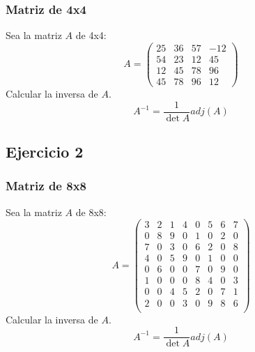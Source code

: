 \documentclass{beamer}
\begin{document}
    \begin{frame}
        \frametitle{Matriz de 4x4}
        Sea la matriz $A$ de 4x4:
        $$
        A =
        \begin{pmatrix}
            25 & 36 & 57 & -12 \\
            54 & 23 & 12 & 45 \\
            12 & 45 & 78 & 96 \\
            45 & 78 & 96 & 12
        \end{pmatrix}
        $$
        Calcular la inversa de $A$.\\
        $$
        A^{-1} = \frac{1}{\det{A}}adj(A)
        $$
    \end{frame}

    \subsection{Ejercicio 2}

    \begin{frame}
        \frametitle{Matriz de 8x8}
        Sea la matriz $A$ de 8x8:
        $$
        A =
        \begin{pmatrix}
              3 & 2 & 1 & 4 & 0 & 5 & 6 & 7 \\
              0 & 8 & 9 & 0 & 1 & 0 & 2 & 0 \\
              7 & 0 & 3 & 0 & 6 & 2 & 0 & 8 \\
              4 & 0 & 5 & 9 & 0 & 1 & 0 & 0 \\
              0 & 6 & 0 & 0 & 7 & 0 & 9 & 0 \\
              1 & 0 & 0 & 0 & 8 & 4 & 0 & 3 \\
              0 & 0 & 4 & 5 & 2 & 0 & 7 & 1 \\
              2 & 0 & 0 & 3 & 0 & 9 & 8 & 6 \\
        \end{pmatrix}
        $$
        Calcular la inversa de $A$.\\
        $$
        A^{-1} = \frac{1}{\det{A}}adj(A)
        $$
    \end{frame}
\end{document}
